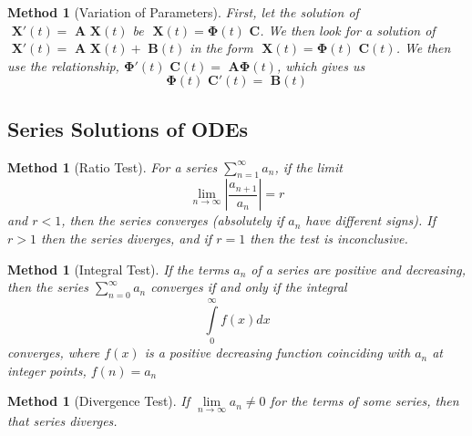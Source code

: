 \documentclass[12pt]{article}
\newtheorem{met}[thm]{Method}
\theoremstyle{definition}
\theoremstyle{remark}
\numberwithin{equation}{section}
\newcommand\B[1]{\textbf{ #1}}
\begin{document}
\vspace{1cm}


\begin{met}[Variation of Parameters]
        First, let the solution of $\B{X}'(t) = \B{A}\B{X}(t)$ be $\B{X}(t) = \boldsymbol{\Phi}(t)\B{C}$. We then look for a solution of $\B{X}'(t) = \B{A}\B{X}(t) + \B{B}(t)$ in the form $\B{X}(t) = \boldsymbol{\Phi}(t)\B{C}(t)$. We then use the relationship, $\boldsymbol{\Phi}'(t)\B{C}(t) = \B{A}\boldsymbol{\Phi}(t)$, which gives us \begin{equation}
                \boldsymbol{\Phi}(t)\B{C}'(t) = \B{B}(t)
        \end{equation}
\end{met}


\subsection{Series Solutions of ODEs}

\begin{met}[Ratio Test]
        For a series $\sum\limits_{n=1}^{\infty}a_n$, if the limit \begin{equation}
                \lim\limits_{n\rightarrow \infty}\left|\frac{a_{n+1}}{a_n}\right| = r
        \end{equation}
        and $r < 1$, then the series converges (absolutely if $a_n$ have different signs). If $r > 1$ then the series diverges, and if $r=1$ then the test is inconclusive.
\end{met}


\vspace{1cm}


\begin{met}[Integral Test]
        If the terms $a_n$ of a series are positive and decreasing, then the series $\sum\limits_{n=0}^{\infty}a_n$ converges if and only if the integral \begin{equation}
                \int\limits_{0}^{\infty}f(x)dx
        \end{equation}
        converges, where $f(x)$ is a positive decreasing function coinciding with $a_n$ at integer points, $f(n) = a_n$
\end{met}

\vspace{1cm}

\begin{met}[Divergence Test]
        If $\lim\limits_{n\rightarrow \infty}a_n \neq 0$ for the terms of some series, then that series diverges.
\end{met}
\end{document}
